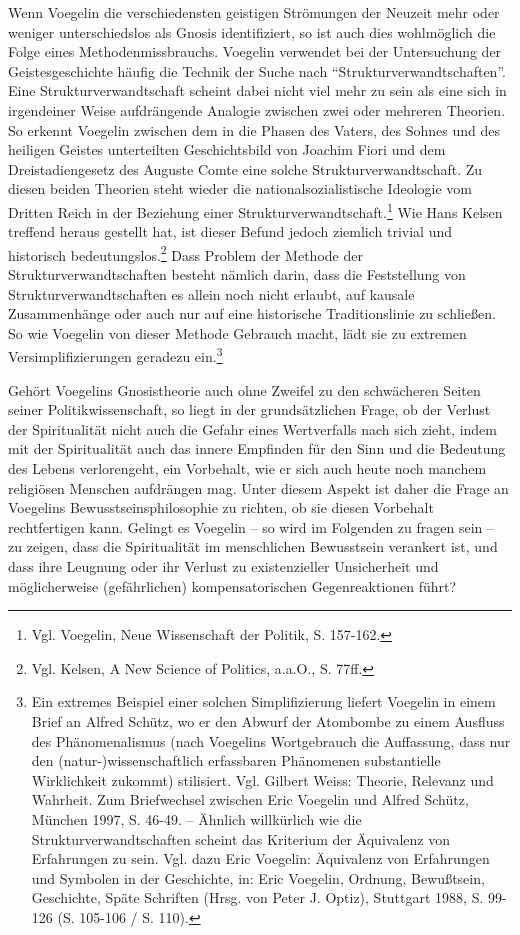 Wenn Voegelin die verschiedensten geistigen Strömungen der Neuzeit mehr oder
weniger unterschiedslos als Gnosis identifiziert, so ist auch dies wohlmöglich
die Folge eines Methodenmissbrauchs. Voegelin verwendet bei der Untersuchung
der Geistesgeschichte häufig die Technik der Suche nach
"`Strukturverwandtschaften"'. Eine Strukturverwandtschaft scheint dabei nicht
viel mehr zu sein als eine sich in irgendeiner Weise aufdrängende Analogie
zwischen zwei oder mehreren Theorien. So erkennt Voegelin zwischen dem in die
Phasen des Vaters, des Sohnes und des heiligen Geistes unterteilten
Geschichtsbild von Joachim Fiori und dem Dreistadiengesetz des Auguste Comte
eine solche Strukturverwandtschaft.  Zu diesen beiden Theorien steht wieder
die nationalsozialistische Ideologie vom Dritten Reich in der Beziehung einer
Strukturverwandtschaft.\footnote{Vgl. Voegelin, Neue Wissenschaft der Politik,
  S. 157-162.}  Wie Hans Kelsen treffend heraus gestellt hat, ist dieser
Befund jedoch ziemlich trivial und historisch bedeutungslos.\footnote{Vgl.
  Kelsen, A New Science of Politics, a.a.O., S. 77ff.} Dass Problem der
Methode der Strukturverwandtschaften besteht nämlich darin, dass die
Feststellung von Strukturverwandtschaften es allein noch nicht erlaubt, auf
kausale Zusammenhänge oder auch nur auf eine historische Traditionslinie zu
schließen. So wie Voegelin von dieser Methode Gebrauch macht, lädt sie zu
extremen Versimplifizierungen geradezu ein.\footnote{Ein extremes Beispiel
  einer solchen Simplifizierung liefert Voegelin in einem Brief an Alfred
  Schütz, wo er den Abwurf der Atombombe zu einem Ausfluss des Phänomenalismus
  (nach Voegelins Wortgebrauch die Auf\/fassung, dass nur den
  (natur-)wissenschaftlich erfassbaren Phänomenen substantielle Wirklichkeit
  zukommt) stilisiert.  Vgl. Gilbert Weiss: Theorie, Relevanz und Wahrheit.
  Zum Briefwechsel zwischen Eric Voegelin und Alfred Schütz, München 1997, S.
  46-49. -- Ähnlich willkürlich wie die Strukturverwandtschaften scheint das
  Kriterium der Äquivalenz von Erfahrungen zu sein. Vgl. dazu Eric Voegelin:
  Äquivalenz von Erfahrungen und Symbolen in der Geschichte, in: Eric
  Voegelin, Ordnung, Bewußtsein, Geschichte, Späte Schriften (Hrsg. von Peter
  J. Optiz), Stuttgart 1988, S.  99-126 (S. 105-106 / S. 110).}

Gehört Voegelins Gnosistheorie auch ohne Zweifel zu den schwächeren Seiten
seiner Politikwissenschaft, so liegt in der grundsätzlichen Frage, ob der
Verlust der Spiritualität nicht auch die Gefahr eines Wertverfalls nach sich
zieht, indem mit der Spiritualität auch das innere Empfinden für den Sinn und
die Bedeutung des Lebens verlorengeht, ein Vorbehalt, wie er sich auch heute
noch manchem religiösen Menschen aufdrängen mag. Unter diesem Aspekt ist daher
die Frage an Voegelins Bewusstseinsphilosophie zu richten, ob sie diesen
Vorbehalt rechtfertigen kann.  Gelingt es Voegelin -- so wird im Folgenden zu
fragen sein -- zu zeigen, dass die Spiritualität im menschlichen Bewusstsein
verankert ist, und dass ihre Leugnung oder ihr Verlust zu existenzieller
Unsicherheit und möglicherweise (gefährlichen) kompensatorischen
Gegenreaktionen führt?

